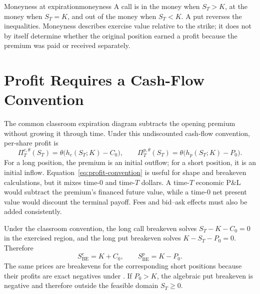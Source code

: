 \documentclass[11pt]{article}
\begin{document}
\begin{definition}{Moneyness at expiration}{moneyness}
A call is in the money when $S_T>K$, at the money when $S_T=K$, and out of the money when $S_T<K$. A put reverses the inequalities. Moneyness describes exercise value relative to the strike; it does not by itself determine whether the original position earned a profit because the premium was paid or received separately.
\end{definition}

\section{Profit Requires a Cash-Flow Convention}

The common classroom expiration diagram subtracts the opening premium without growing it through time. Under this undiscounted cash-flow convention, per-share profit is
\begin{equation}
  \label{eq:profit-convention}
  \Pi_T^{c,\theta}(S_T)=\theta\bigl(h_c(S_T;K)-C_0\bigr),
  \qquad
  \Pi_T^{p,\theta}(S_T)=\theta\bigl(h_p(S_T;K)-P_0\bigr).
\end{equation}
For a long position, the premium is an initial outflow; for a short position, it is an initial inflow. Equation~\eqref{eq:profit-convention} is useful for shape and breakeven calculations, but it mixes time-$0$ and time-$T$ dollars. A time-$T$ economic P\&L would subtract the premium's financed future value, while a time-$0$ net present value would discount the terminal payoff. Fees and bid--ask effects must also be added consistently.

Under the classroom convention, the long call breakeven solves $S_T-K-C_0=0$ in the exercised region, and the long put breakeven solves $K-S_T-P_0=0$. Therefore
\begin{equation}
  \label{eq:breakevens}
  S_{\mathrm{BE}}^{c}=K+C_0,
  \qquad
  S_{\mathrm{BE}}^{p}=K-P_0.
\end{equation}
The same prices are breakevens for the corresponding short positions because their profits are exact negatives under . If $P_0>K$, the algebraic put breakeven is negative and therefore outside the feasible domain $S_T\geq0$.
\end{document}
